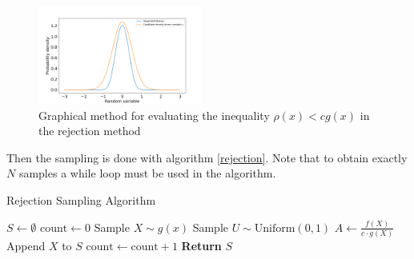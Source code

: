 \begin{figure}[t!]
\centering
\includegraphics[width=0.48\textwidth]{FIG/exercise_2_images/rejection_sampling_inequality_check.png}
\caption{Graphical method for evaluating the inequality $\rho(x)< cg(x)$ in the rejection method}
\label{chapter2_rej_ineq}
\end{figure}

Then the sampling is done with algorithm \ref{rejection}. Note that to obtain exactly $N$ samples a while loop must be used in the algorithm.

\begin{algorithm}
\caption{Rejection Sampling Algorithm}
\begin{algorithmic}[1]
\State \( S \leftarrow \emptyset \)
\State \( \text{count} \leftarrow 0 \)
    \State Sample \( X \sim g(x) \) 
    \State Sample \( U \sim \text{Uniform}(0, 1) \) 
    \State \( A \leftarrow \frac{f(X)}{c \cdot g(X)} \) 
        \State Append \( X \) to \( S \)
        \State \( \text{count} \leftarrow \text{count} + 1 \)
    \EndIf
\EndWhile
\State \textbf{Return} \( S \)
\end{algorithmic}
\label{rejection}
\end{algorithm}